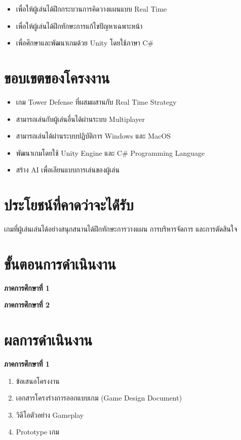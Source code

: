 \documentclass[12pt,oneside,openright,a4paper]{cpe-thai-project}
\begin{document}
\begin{itemize}
\item เพื่อให้ผู้เล่นได้ฝึกกระบวนการคิดวางแผนแบบ Real Time 
\item เพื่อให้ผู้เล่นได้ฝึกทักษะการแก้ไขปัญหาเฉพาะหน้า
\item เพื่อศึกษาและพัฒนาเกมด้วย Unity โดยใช้ภาษา C\#
\end{itemize}


\section{ขอบเขตของโครงงาน}

\begin{itemize}
\item  เกม Tower Defense ที่ผสมผสานกับ Real Time Strategy
\item  สามารถเล่นกับผู้เล่นอื่นได้ผ่านระบบ Multiplayer 
\item  สามารถเล่นได้ผ่านระบบปฏิบัติการ Windows และ MacOS
\item  พัฒนาเกมโดยใช้ Unity Engine และ C\# Programming Language 
\item  สร้าง AI เพื่อเลียนแบบการเล่นของผู้เล่น 
\end{itemize}


\section{ประโยชน์ที่คาดว่าจะได้่รับ}

เกมที่ผู้เล่นเล่นได้อย่างสนุกสนานได้ฝึกทักษะการวางแผน การบริหารจัดการ และการตัดสินใจ

\section{ขั้นตอนการดำเนินงาน}
\textbf{ภาคการศึกษาที่ 1}

\textbf{ภาคการศึกษาที่ 2}


\section{ผลการดำเนินงาน}

\textbf{ภาคการศึกษาที่ 1}
\begin{enumerate}
  \item ข้อเสนอโครงงาน
  \item เอกสารโครงร่างการออกแบบเกม (Game Design Document) 
  \item วิดีโอตัวอย่าง Gameplay
  \item Prototype เกม
  
\end{enumerate}
\end{document}
